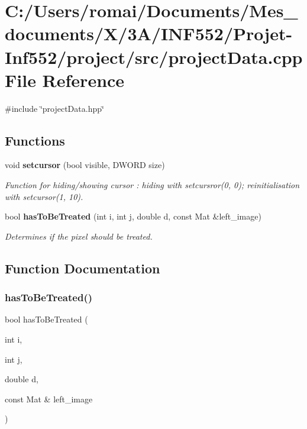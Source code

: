 \section{C\+:/\+Users/romai/\+Documents/\+Mes\+\_\+documents/\+X/3\+A/\+I\+N\+F552/\+Projet-\/\+Inf552/project/src/project\+Data.cpp File Reference}
\label{project_data_8cpp}
{\ttfamily \#include \char`\"{}project\+Data.\+hpp\char`\"{}}\newline
\subsection*{Functions}
\begin{DoxyCompactItemize}
\item 
void \textbf{ setcursor} (bool visible, D\+W\+O\+RD size)
\begin{DoxyCompactList}\small\item\em Function for hiding/showing cursor \+: hiding with setcursror(0, 0); reinitialisation with setcursor(1, 10). \end{DoxyCompactList}\item 
bool \textbf{ has\+To\+Be\+Treated} (int i, int j, double d, const Mat \&left\+\_\+image)
\begin{DoxyCompactList}\small\item\em Determines if the pixel should be treated. \end{DoxyCompactList}\end{DoxyCompactItemize}


\subsection{Function Documentation}
\mbox{\label{project_data_8cpp_a51661db0d98d3b889acb2cc3aab03837}} 
\subsubsection{has\+To\+Be\+Treated()}
{\footnotesize\ttfamily bool has\+To\+Be\+Treated (\begin{DoxyParamCaption}\item[{int}]{i,  }\item[{int}]{j,  }\item[{double}]{d,  }\item[{const Mat \&}]{left\+\_\+image }\end{DoxyParamCaption})\hspace{0.3cm}{\ttfamily [inline]}}



